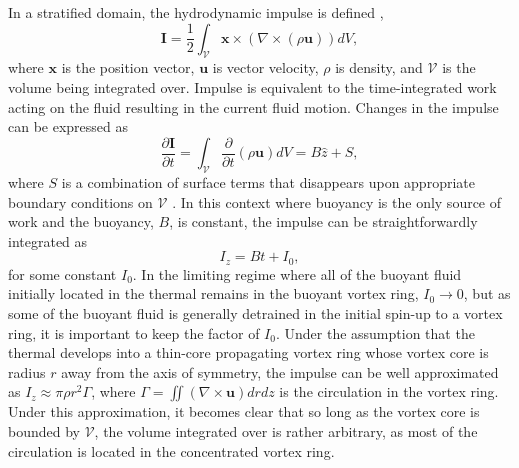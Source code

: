 \documentclass[twocolumn, amsmath, amsfonts, amssymb, trackchanges]{aastex62}
\newcommand{\grad}{\ensuremath{\nabla}}
\begin{document}
In a stratified domain, the hydrodynamic impulse is defined
\citep{shivamoggi2010},
\begin{equation}
\bm{I} = \frac{1}{2}\int_{\mathcal{V}} \bm{x}\times(\grad\times(\rho\bm{u}))dV,
\end{equation}
where $\bm{x}$ is the position vector, $\bm{u}$ is vector velocity, $\rho$ is density,
and $\mathcal{V}$ is the volume being integrated over. Impulse is equivalent to the time-integrated
work acting on the fluid resulting in the current fluid motion. 
Changes in the impulse can be expressed as
\begin{equation}
\frac{\partial\bm{I}}{\partial t} = \int_{\mathcal{V}}\frac{\partial}{\partial t}(\rho \bm{u})dV
= B\hat{z} + S,
\end{equation}
where $S$ is a combination of surface terms that disappears upon appropriate boundary conditions
on $\mathcal{V}$ \citep{shivamoggi2010}. In this context where buoyancy is the only source of
work and the buoyancy, $B$, is constant, the impulse can be straightforwardly integrated as
\begin{equation}
I_z = B t + I_0,
\end{equation}
for some constant $I_0$. In the limiting regime where all of the buoyant fluid initially
located in the thermal remains in the buoyant vortex ring, $I_0 \rightarrow 0$, but as
some of the buoyant fluid is generally detrained in the initial spin-up to a vortex ring,
it is important to keep the factor of $I_0$.
Under the assumption that the thermal develops into a thin-core 
propagating vortex ring whose vortex core is radius $r$ away from the axis of symmetry, 
the impulse can be well approximated as $I_z \approx \pi \rho r^2 \Gamma$, where 
$\Gamma = \iint (\grad\times\bm{u}) dr dz$ is the circulation in the vortex ring.
Under this approximation, it becomes clear that so long as the vortex core is bounded
by $\mathcal{V}$, the volume integrated over is rather arbitrary, as most of the circulation
is located in the concentrated vortex ring.
\end{document}
